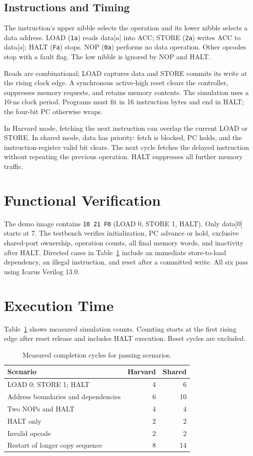 \documentclass[conference,a4paper]{IEEEtran}
\begin{document}
\subsection{Instructions and Timing}
The instruction's upper nibble selects the operation and its lower nibble
selects a data address. LOAD (\texttt{1a}) reads data[$a$] into ACC;
STORE (\texttt{2a}) writes ACC to data[$a$]; HALT (\texttt{Fa}) stops.
NOP (\texttt{0a}) performs no data operation. Other opcodes stop with a
fault flag. The low nibble is ignored by NOP and HALT.

Reads are combinational; LOAD captures data and STORE commits its write
at the rising clock edge. A synchronous active-high reset clears the
controller, suppresses memory requests, and retains memory contents.
The simulation uses a 10-ns clock period. Programs must fit in 16 instruction bytes
and end in HALT; the four-bit PC otherwise wraps.

In Harvard mode, fetching the next instruction can overlap the current
LOAD or STORE. In shared mode, data has priority: fetch is blocked, PC
holds, and the instruction-register valid bit clears. The next cycle
fetches the delayed instruction without repeating the previous operation.
HALT suppresses all further memory traffic.

\section{Functional Verification}
The demo image contains \texttt{10 21 F0} (LOAD 0, STORE 1, HALT).
Only data[0] starts at 7. The testbench verifies initialization,
PC advance or hold, exclusive shared-port ownership, operation counts,
all final memory words, and inactivity after HALT. Directed cases in
Table~\ref{tab:results} include an immediate store-to-load dependency,
an illegal instruction, and reset after a committed write.
All six pass using Icarus Verilog 13.0.

\section{Execution Time}
Table~\ref{tab:results} shows measured simulation counts. Counting starts
at the first rising edge after reset release and includes HALT execution.
Reset cycles are excluded.

\begin{table}[t]
\caption{Measured completion cycles for passing scenarios.}
\label{tab:results}
\centering
\begin{tabular}{lrr}
\hline
Scenario & Harvard & Shared \\ \hline
LOAD 0; STORE 1; HALT & 4 & 6 \\
Address boundaries and dependencies & 6 & 10 \\
Two NOPs and HALT & 4 & 4 \\
HALT only & 2 & 2 \\
Invalid opcode & 2 & 2 \\
Restart of longer copy sequence & 8 & 14 \\ \hline
\end{tabular}
\end{table}
\end{document}
